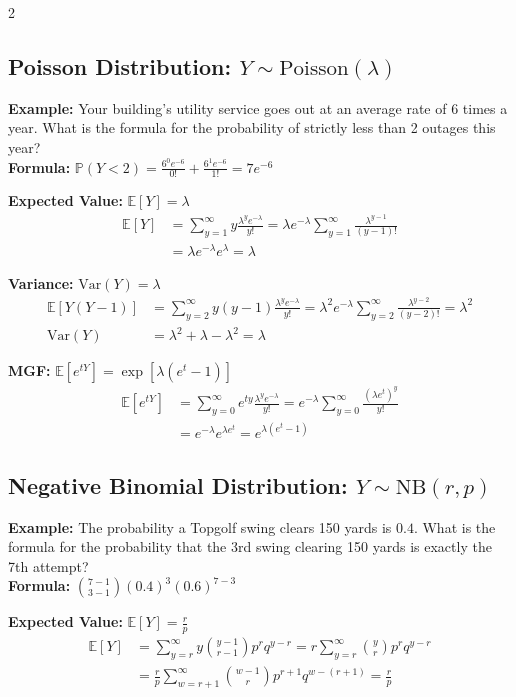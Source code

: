 \documentclass[11pt, letterpaper]{article}
\theoremstyle{definition}
\theoremstyle{remark}
\newcommand{\E}{\mathbb{E}}
\newcommand{\Prob}{\mathbb{P}}
\begin{document}
\begin{multicols*}{2}
\subsection{Poisson Distribution: $Y \sim \text{Poisson}(\lambda)$}
\textbf{Example:} Your building's utility service goes out at an average rate of 6 times a year. What is the formula for the probability of strictly less than 2 outages this year? \\
\textbf{Formula:} $\Prob(Y < 2) = \frac{6^0 e^{-6}}{0!} + \frac{6^1 e^{-6}}{1!} = 7e^{-6}$

\textbf{Expected Value:} $\E[Y] = \lambda$
\begin{align*}
\E[Y] &= \sum_{y=1}^{\infty} y \frac{\lambda^y e^{-\lambda}}{y!} = \lambda e^{-\lambda} \sum_{y=1}^{\infty} \frac{\lambda^{y-1}}{(y-1)!} \\
&= \lambda e^{-\lambda} e^\lambda = \lambda
\end{align*}

\textbf{Variance:} $\text{Var}(Y) = \lambda$
\begin{align*}
\E[Y(Y-1)] &= \sum_{y=2}^{\infty} y(y-1) \frac{\lambda^y e^{-\lambda}}{y!} = \lambda^2 e^{-\lambda} \sum_{y=2}^{\infty} \frac{\lambda^{y-2}}{(y-2)!} = \lambda^2 \\
\text{Var}(Y) &= \lambda^2 + \lambda - \lambda^2 = \lambda
\end{align*}

\textbf{MGF:} $\E[e^{tY}] = \exp[\lambda(e^t - 1)]$
\begin{align*}
\E[e^{tY}] &= \sum_{y=0}^{\infty} e^{ty} \frac{\lambda^y e^{-\lambda}}{y!} = e^{-\lambda} \sum_{y=0}^{\infty} \frac{(\lambda e^t)^y}{y!} \\
&= e^{-\lambda} e^{\lambda e^t} = e^{\lambda(e^t - 1)}
\end{align*}

\subsection{Negative Binomial Distribution: $Y \sim \text{NB}(r, p)$}
\textbf{Example:} The probability a Topgolf swing clears 150 yards is $0.4$. What is the formula for the probability that the 3rd swing clearing 150 yards is exactly the 7th attempt? \\
\textbf{Formula:} $\binom{7-1}{3-1} (0.4)^3 (0.6)^{7-3}$

\textbf{Expected Value:} $\E[Y] = \frac{r}{p}$
\begin{align*}
\E[Y] &= \sum_{y=r}^{\infty} y \binom{y-1}{r-1} p^r q^{y-r} = r \sum_{y=r}^{\infty} \binom{y}{r} p^r q^{y-r} \\
&= \frac{r}{p} \sum_{w=r+1}^{\infty} \binom{w-1}{r} p^{r+1} q^{w-(r+1)} = \frac{r}{p}
\end{align*}


\end{multicols*}
\end{document}
